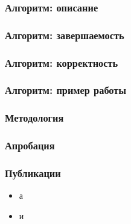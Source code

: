 \documentclass{beamer}
\begin{document}
\begin{frame}
	\transwipe[direction=90]
	\frametitle{Алгоритм: описание}
\end{frame}

\begin{frame}
	\transwipe[direction=90]
	\frametitle{Алгоритм: завершаемость}
	\begin{theorem}


	\end{theorem}
\end{frame}

\begin{frame}
	\transwipe[direction=90]
	\frametitle{Алгоритм: корректность}
	\begin{theorem}


	\end{theorem}

\end{frame}

\begin{frame}
	\transwipe[direction=90]
	\frametitle{Алгоритм: пример работы}
\end{frame}

\begin{frame}[t]
	\transwipe[direction=90]
	\frametitle{Методология}
\end{frame}

\begin{frame}[t]
	\transwipe[direction=90]
	\frametitle{Апробация}
\end{frame}

\begin{frame}
	\transwipe[direction=90]
	\frametitle{Публикации}
  \begin{itemize}
	  \item  а
	  \item  и
  \end{itemize}	
\end{frame}
\end{document}
